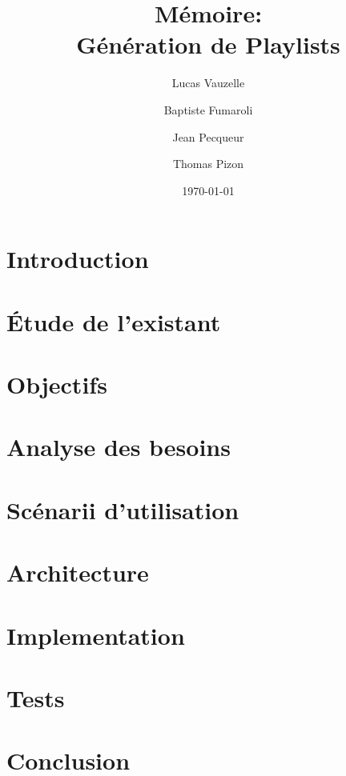 \documentclass[a4paper, 11pt]{memoir}
\title{Mémoire:\\ Génération de Playlists}
\author{Lucas Vauzelle \and Baptiste Fumaroli \and Jean Pecqueur \and Thomas Pizon}
\date{\today}
\begin{document}
\maketitle %
\clearpage

\frontmatter*

\chapter*{Introduction}


\clearpage

\setcounter{tocdepth}{3}
\tableofcontents

\mainmatter*

\chapter{Étude de l'existant}

\chapter{Objectifs}

\chapter{Analyse des besoins}

\chapter{Scénarii d'utilisation}

\chapter{Architecture}

\chapter{Implementation}

\chapter{Tests}

\chapter*{Conclusion}


\backmatter

% 
% 

\listoffigures
\end{document}
